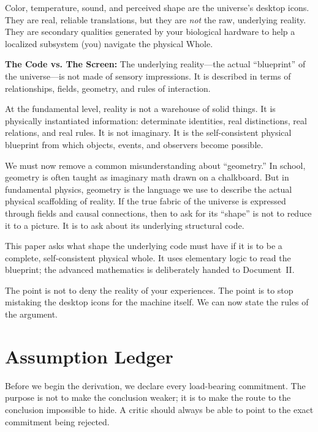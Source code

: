 \documentclass[11pt]{article}
\theoremstyle{canonstyle}
\begin{document}
Color, temperature, sound, and perceived shape are the universe's desktop icons. They are real, reliable translations, but they are \emph{not} the raw, underlying reality. They are secondary qualities generated by your biological hardware to help a localized subsystem (you) navigate the physical Whole.

\begin{keyresult}
\textbf{The Code vs. The Screen:} The underlying reality---the actual ``blueprint'' of the universe---is not made of sensory impressions. It is described in terms of relationships, fields, geometry, and rules of interaction. 
\end{keyresult}

At the fundamental level, reality is not a warehouse of solid things. It is physically instantiated information: determinate identities, real distinctions, real relations, and real rules. It is not imaginary. It is the self-consistent physical blueprint from which objects, events, and observers become possible.

We must now remove a common misunderstanding about ``geometry.'' In school, geometry is often taught as imaginary math drawn on a chalkboard. But in fundamental physics, geometry is the language we use to describe the actual physical scaffolding of reality. If the true fabric of the universe is expressed through fields and causal connections, then to ask for its ``shape'' is not to reduce it to a picture. It is to ask about its underlying structural code.

This paper asks what shape the underlying code must have if it is to be a complete, self-consistent physical whole. It uses elementary logic to read the blueprint; the advanced mathematics is deliberately handed to Document~II.

The point is not to deny the reality of your experiences. The point is to stop mistaking the desktop icons for the machine itself. We can now state the rules of the argument.

\newpage
\section*{Assumption Ledger}
{}

Before we begin the derivation, we declare every load-bearing commitment. The purpose is not to make the conclusion weaker; it is to make the route to the conclusion impossible to hide. A critic should always be able to point to the exact commitment being rejected.
\end{document}
